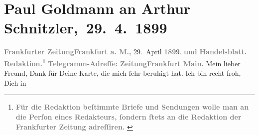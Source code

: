 

         
         \renewcommand{\erwaehntePersonen}{Personen: Alfred Dreyfus, Fedor Mamroth, Josef Rosengart, Vally Rosengart}
         \renewcommand{\erwaehnteInstitutionen}{Institutionen: Frankfurter Zeitung}
         \renewcommand{\erwaehnteOrte}{Orte: Berlin, Deutsches Theater Berlin, Frankfurt am Main, Wien}
         \renewcommand{\erwaehnteWerke}{Werke: Der grüne Kakadu – Paracelsus – Die Gefährtin. Drei Einakter}
               \section[ Paul Goldmann an Arthur Schnitzler, 29. 4. 1899]{ Paul Goldmann an Arthur Schnitzler, 29. 4. 1899}\nopagebreak{}\rehead{ }\begin{ledgroupsized}[t]{13cm}\normalsize\beginnumbering \toendnotes[C]{\smallbreak\pagebreak[2]} 
\toendnotes[C]{\smallbreak}\pstart
           \noindent{}{\pb}\textcolor{gray}{\textbf{\textbf{Frankfurter Zeitung}}}\hfill \textcolor{gray}{\textbf{\textbf{Frankfurt a. M.,}}}{ }29. April \textcolor{gray}{\textbf{189}}9.\pend
           \pstart
           \textcolor{gray}{\textbf{und}}\pend
           \pstart
           \textcolor{gray}{\textbf{Handelsblatt.}}\pend
           \pstart
           \textcolor{gray}{\textbf{\textbf{Redaktion.}\footnote{\noindent{}\textcolor{gray}{\textbf{Für die Redaktion beſtimmte Briefe und Sendungen wolle man
                                  an die Perſon eines Redakteurs,
                              ſondern ſtets \textbf{an die Redaktion der Frankfurter Zeitung} adreſſiren. }}}}}\pend
           \pstart
           \textcolor{gray}{\textbf{Telegramm-Adreſſe:}}\pend
           \pstart
           \textcolor{gray}{\textbf{\textbf{ZeitungFrankfurt Main.}}}\pend
           \pstart{}Mein lieber Freund,\pend\pstart
           Dank für Deine Karte, die mich ſehr beruhigt hat. Ich bin recht froh, Dich in \label{K_L02873-1v}
\end{ledgroupsized}

